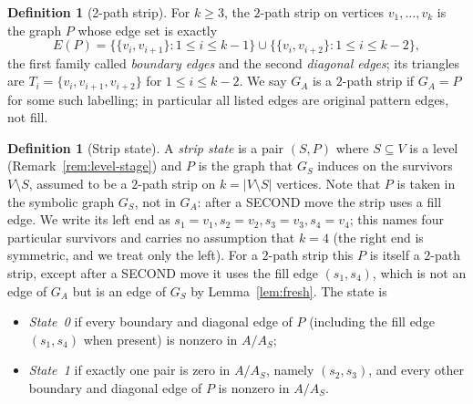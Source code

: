 \documentclass[11pt]{article}
\theoremstyle{plain}
\theoremstyle{definition}
\newtheorem{definition}[theorem]{Definition}
\begin{document}
\begin{aiblock}
\begin{definition}[2-path strip]\label{def:strip}
For $k\ge3$, the $2$-path strip on vertices $v_1,\dots,v_k$ is the graph $P$ whose edge set is exactly
\[
E(P)=\bigl\{\{v_i,v_{i+1}\}:1\le i\le k-1\bigr\}\cup\bigl\{\{v_i,v_{i+2}\}:1\le i\le k-2\bigr\},
\]
the first family called \emph{boundary edges} and the second \emph{diagonal edges}; its triangles are $T_i=\{v_i,v_{i+1},v_{i+2}\}$ for $1\le i\le k-2$. We say $G_A$ is a $2$-path strip if $G_A=P$ for some such labelling; in particular all listed edges are original pattern edges, not fill.
\end{definition}

\begin{definition}[Strip state]\label{def:strip-state}
A \emph{strip state} is a pair $(S,P)$ where $S\subseteq V$ is a level
(Remark~\ref{rem:level-stage}) and $P$ is the graph that $G_S$ induces on the survivors
$V\setminus S$, assumed to be a $2$-path strip on $k=|V\setminus S|$ vertices. Note that $P$ is taken
in the symbolic graph $G_S$, not in $G_A$: after a SECOND move the strip uses a fill edge. We write
its left end as $s_1=v_1,s_2=v_2,s_3=v_3,s_4=v_4$; this names four particular survivors and carries no
assumption that $k=4$ (the right end is symmetric, and we treat only the left). For a $2$-path strip this $P$ is itself a $2$-path strip, except after a SECOND move it uses the fill edge $(s_1,s_4)$, which is not an edge of $G_A$ but is an edge of $G_S$ by Lemma~\ref{lem:fresh}. The state is
\begin{itemize}
\item \emph{State~0} if every boundary and diagonal edge of $P$ (including the fill edge $(s_1,s_4)$ when present) is nonzero in $A/A_S$;
\item \emph{State~1} if exactly one pair is zero in $A/A_S$, namely $(s_2,s_3)$, and every other boundary and diagonal edge of $P$ is nonzero in $A/A_S$.
\end{itemize}
\end{definition}


\end{aiblock}
\end{document}
